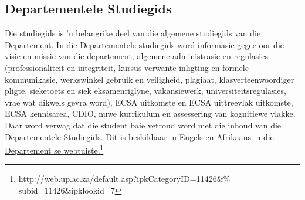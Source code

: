     \subsection{Departementele Studiegids}
        Die studiegids is 'n belangrike deel van die algemene studiegids van die 
        Departement. In die Departementele studiegids word informasie gegee
        oor die visie en missie van die departement, algemene administrasie en 
        regulasies (professionaliteit en integriteit, kursus verwante inligting
        en formele kommunikasie, werkswinkel gebruik en veiligheid, plagiaat,
        klasverteenwoordiger pligte, sieketoets en siek eksamenriglyne, vakansiewerk,
        universiteitsregulasies, vrae wat dikwels gevra word), ECSA uitkomste
        en ECSA uittreevlak uitkomste, ECSA kennisarea, CDIO, nuwe kurrikulum en 
        assessering van kognitiewe vlakke.  Daar word verwag dat die student baie vetroud word
        met die inhoud van die Departementele Studiegids.  Dit is beskikbaar in Engels
        en Afrikaans in die
        \href{http://web.up.ac.za/default.asp?ipkCategoryID=11426&subid=11426&%
              ipklookid=7}{Departement se webtuiste.\footnote{%
              \url{http://web.up.ac.za/default.asp?ipkCategoryID=11426&%
                   subid=11426&ipklookid=7}}}